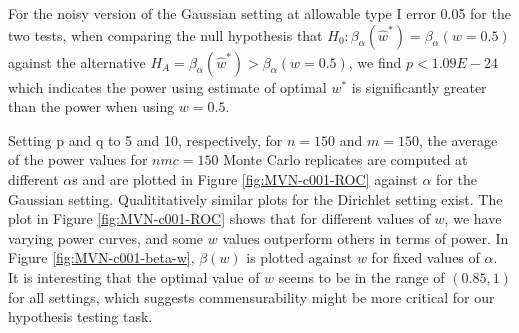 \documentclass[11pt]{article} %
\begin{document}

For the noisy version of the Gaussian setting at allowable type I error 0.05 for the two tests, when comparing  the null hypothesis that  $H_{0}: \beta_{\alpha}({\hat{w}^*})=\beta_{\alpha}({w=0.5})$ against the alternative $H_{A}=\beta_{\alpha}({\hat{w}^*})>\beta_{\alpha}({w=0.5})$, we find $p<1.09E-24$ which indicates the power using estimate of optimal $w^*$ is significantly greater than the power when using $w=0.5$. 





Setting p and q to 5 and 10, respectively, for $n=150$ and $m=150$, the average of the power values for $nmc=150$ Monte Carlo replicates are computed at  different $\alpha$s and are plotted in Figure \ref{fig:MVN-c001-ROC} against $\alpha$ for the Gaussian setting.  Qualititatively similar plots for the Dirichlet setting  exist.  The plot in Figure \ref{fig:MVN-c001-ROC} shows that for different values of  $w$, we have varying power curves, and some $w$ values outperform others in terms of power. In Figure \ref{fig:MVN-c001-beta-w},  $\beta(w)$ is plotted against $w$ for fixed values of $\alpha$. It is  interesting that the optimal value of $w$ seems to be in the range of $(0.85,1)$ for all settings, which suggests commensurability might be more critical for our hypothesis testing task. 
\end{document}
